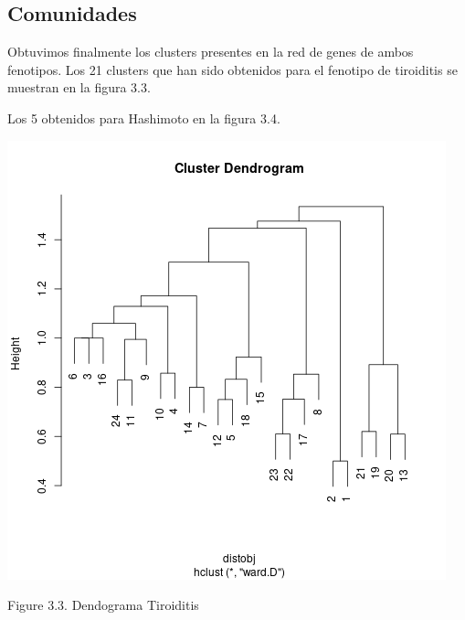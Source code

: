 \subsection*{Comunidades}
Obtuvimos finalmente los clusters presentes en la red de genes de ambos fenotipos. Los 21 clusters que han sido obtenidos para el fenotipo de tiroiditis se muestran en la figura 3.3.

Los 5 obtenidos para Hashimoto en la figura 3.4.

\begin{center}
 
    \includegraphics[scale=0.5]{figures/comunidades_tiroiditis.png}
    
    Figure 3.3. Dendograma Tiroiditis
\end{center}

